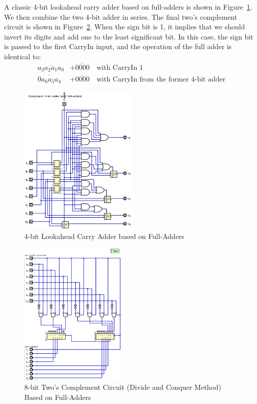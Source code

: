 \documentclass[conference]{IEEEtran}
\begin{document}
A classic 4-bit lookahead carry adder based on full-adders is shown in Figure~\ref{fig:lca}. We then combine the two 4-bit adder in series. The final two's complement circuit is shown in Figure~\ref{fig:tc-dq}. When the
sign bit is 1, it implies that we should invert its digits and add one to the least significant bit. In this case, the sign bit is passed to the first CarryIn input, and the operation of the full adder is identical to:
\begin{align}\label{eq:carry-bits-result}
    \overline{a_3 a_2 a_1 a_0} &+ \overline{0000} \quad \text{with CarryIn } 1 \\
    \overline{0 a_6 a_5 a_4} &+ \overline{0000} \quad \text{with CarryIn from the former 4-bit adder}
\end{align}

\begin{figure}[h!]
    \centering
    \includegraphics[width=0.5\textwidth]{assets/adder_4bits.png}
    \caption{4-bit Lookahead Carry Adder based on Full-Adders}
    \label{fig:lca}
    \end{figure}


    \begin{figure}[h!]
        \centering
        \includegraphics[width=0.45\textwidth]{assets/twos_complement_dq.png}
        \caption{8-bit Two's Complement Circuit (Divide and Conquer Method) Based on Full-Adders}
        \label{fig:tc-dq}
        \end{figure}
\end{document}
